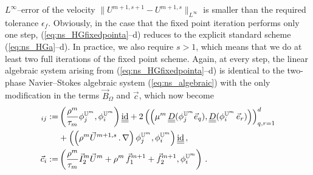 \documentclass[a4paper,12pt,onecolumn]{article}
\newcommand{\uspacesimple}{\mathbb{U}}
\newcommand{\id}{\rm id}
\newcommand{\mat}[1]{\underline{\underline{#1}}\rule{0pt}{0pt}}
\begin{document}
$L^\infty$--error of the velocity $\|U^{m+1,s+1}-U^{m+1,s} \|_{L^\infty}$ is
smaller than the required tolerance $\epsilon_f$. Obviously, in the case that
the fixed point iteration performs only one step,
(\ref{eq:ns_HGfixedpointa}--d) reduces to the explicit standard scheme
(\ref{eq:ns_HGa}--d). In practice, we also require $s>1$, which means that we
do at least two full iterations of the fixed point scheme. Again, at every
step, the linear algebraic system arising from (\ref{eq:ns_HGfixedpointa}--d)
is identical to the two-phase Navier--Stokes algebraic system
(\ref{eq:ns_algebraic}) with the only modification in the terms
$\vec B_{\Omega}$ and $\vec c$, which now become
\begin{align*}
[\vec B_\Omega]_{ij} := & \left( \frac{\rho^m}{\tau_m} \phi_j^{\uspacesimple^m},
\phi_i^{\uspacesimple^m} \right)\mat \id
+ 2\left(\left(\mu^m\,\mat D(\phi_j^{\uspacesimple^m} \vec e_q),
\mat D(\phi_i^{\uspacesimple^m}\,\vec e_r) \right) \right)_{q,r=1}^d\\
& + \left( \left(\rho^m \vec U^{m+1,s}\,.\,\nabla \right)
\phi_j^{\uspacesimple^m},
\phi_i^{\uspacesimple^m} \right)\mat \id \,,\\
\vec c_i := &\left( \frac{\rho^m}{\tau_m}\vec I_2^m\vec U^m +
\rho^m\,\vec f_1^{m+1}+\vec f_2^{m+1},\phi_i^{\uspacesimple^m}\right)\,.
\end{align*}
\end{document}
